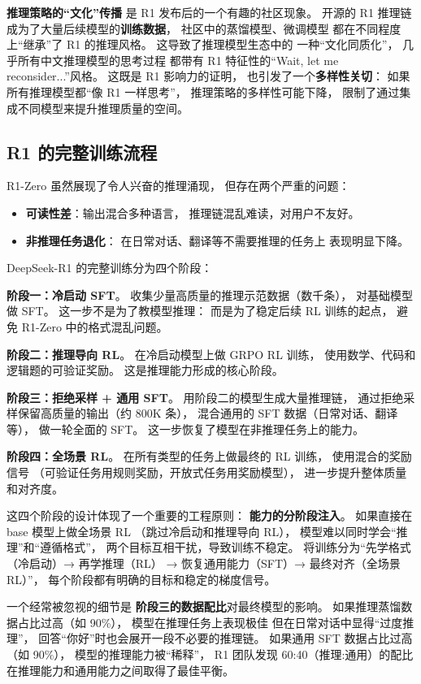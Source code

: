 \textbf{推理策略的“文化”传播}
是 R1 发布后的一个有趣的社区现象。
开源的 R1 推理链成为了大量后续模型的\textbf{训练数据}，
社区中的蒸馏模型、微调模型
都在不同程度上“继承”了 R1 的推理风格。
这导致了推理模型生态中的
一种“文化同质化”，
几乎所有中文推理模型的思考过程
都带有 R1 特征性的“Wait, let me reconsider...”风格。
这既是 R1 影响力的证明，
也引发了一个\textbf{多样性关切}：
如果所有推理模型都“像 R1 一样思考”，
推理策略的多样性可能下降，
限制了通过集成不同模型来提升推理质量的空间。

\subsection{R1 的完整训练流程}

R1-Zero 虽然展现了令人兴奋的推理涌现，
但存在两个严重的问题：
\begin{itemize}[noitemsep]
  \item \textbf{可读性差}：输出混合多种语言，
        推理链混乱难读，对用户不友好。
  \item \textbf{非推理任务退化}：
        在日常对话、翻译等不需要推理的任务上
        表现明显下降。
\end{itemize}

DeepSeek-R1 的完整训练分为四个阶段：

\textbf{阶段一：冷启动 SFT}。
收集少量高质量的推理示范数据（数千条），
对基础模型做 SFT。
这一步不是为了教模型推理：
而是为了稳定后续 RL 训练的起点，
避免 R1-Zero 中的格式混乱问题。

\textbf{阶段二：推理导向 RL}。
在冷启动模型上做 GRPO RL 训练，
使用数学、代码和逻辑题的可验证奖励。
这是推理能力形成的核心阶段。

\textbf{阶段三：拒绝采样 + 通用 SFT}。
用阶段二的模型生成大量推理链，
通过拒绝采样保留高质量的输出（约 800K 条），
混合通用的 SFT 数据（日常对话、翻译等），
做一轮全面的 SFT。
这一步恢复了模型在非推理任务上的能力。

\textbf{阶段四：全场景 RL}。
在所有类型的任务上做最终的 RL 训练，
使用混合的奖励信号
（可验证任务用规则奖励，开放式任务用奖励模型），
进一步提升整体质量和对齐度。

这四个阶段的设计体现了一个重要的工程原则：
\textbf{能力的分阶段注入}。
如果直接在 base 模型上做全场景 RL
（跳过冷启动和推理导向 RL），
模型难以同时学会“推理”和“遵循格式”，
两个目标互相干扰，导致训练不稳定。
将训练分为“先学格式（冷启动）→ 再学推理（RL）
→ 恢复通用能力（SFT）→ 最终对齐（全场景 RL）”，
每个阶段都有明确的目标和稳定的梯度信号。

一个经常被忽视的细节是
\textbf{阶段三的数据配比}对最终模型的影响。
如果推理蒸馏数据占比过高（如 90\%），
模型在推理任务上表现极佳
但在日常对话中显得“过度推理”，
回答“你好”时也会展开一段不必要的推理链。
如果通用 SFT 数据占比过高（如 90\%），
模型的推理能力被“稀释”，
R1 团队发现 60:40（推理:通用）的配比
在推理能力和通用能力之间取得了最佳平衡。

